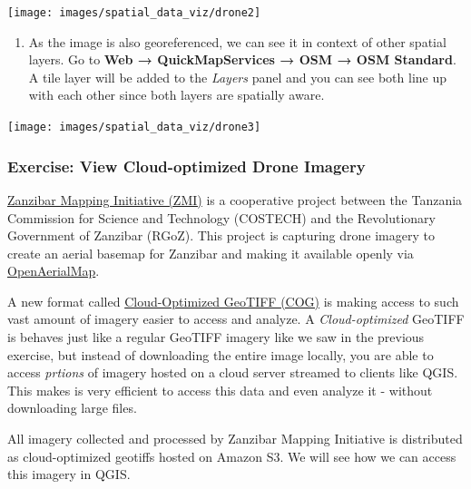\documentclass[
  12pt,
  a4paper]{article}
\providecommand{\tightlist}{%
  \setlength{\itemsep}{0pt}\setlength{\parskip}{0pt}}
\begin{document}
\begin{center}\texttt{[image: images/spatial\_data\_viz/drone2]} \end{center}

\begin{enumerate}
\def\labelenumi{\arabic{enumi}.}
\setcounter{enumi}{2}
\tightlist
\item
  As the image is also georeferenced, we can see it in context of other
  spatial layers. Go to \textbf{Web → QuickMapServices → OSM → OSM
  Standard}. A tile layer will be added to the \emph{Layers} panel and
  you can see both line up with each other since both layers are
  spatially aware.
\end{enumerate}

\begin{center}\texttt{[image: images/spatial\_data\_viz/drone3]} \end{center}

\hypertarget{exercise-view-cloud-optimized-drone-imagery}{%
\subsubsection{Exercise: View Cloud-optimized Drone
Imagery}\label{exercise-view-cloud-optimized-drone-imagery}}

\href{https://map.openaerialmap.org/\#/39.220848083496094,-6.162059582511514,11/user/5ac4842b26964b0010033104}{Zanzibar
Mapping Initiative (ZMI)} is a cooperative project between the Tanzania
Commission for Science and Technology (COSTECH) and the Revolutionary
Government of Zanzibar (RGoZ). This project is capturing drone imagery
to create an aerial basemap for Zanzibar and making it available openly
via \href{https://openaerialmap.org/}{OpenAerialMap}.

A new format called \href{https://www.cogeo.org/}{Cloud-Optimized
GeoTIFF (COG)} is making access to such vast amount of imagery easier to
access and analyze. A \emph{Cloud-optimized} GeoTIFF is behaves just
like a regular GeoTIFF imagery like we saw in the previous exercise, but
instead of downloading the entire image locally, you are able to access
\emph{prtions} of imagery hosted on a cloud server streamed to clients
like QGIS. This makes is very efficient to access this data and even
analyze it - without downloading large files.

All imagery collected and processed by Zanzibar Mapping Initiative is
distributed as cloud-optimized geotiffs hosted on Amazon S3. We will see
how we can access this imagery in QGIS.
\end{document}
